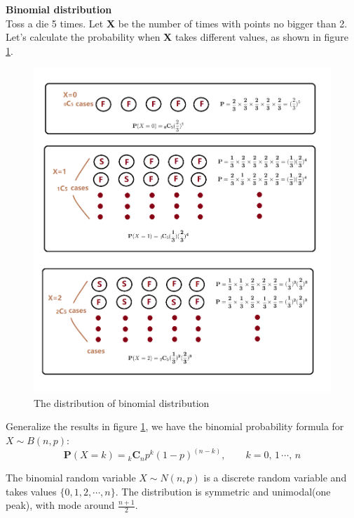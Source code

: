 \documentclass[a4paper, 12pt,twoside]{book}
\begin{document}
      \noindent\textbf{Binomial distribution}\vspace{0.6cm}\\
Toss a die 5 times. Let \textbf{X} be the number of times with points no bigger than 2. Let's calculate the probability when \textbf{X} takes different values, as shown in figure \ref{BinomialDistribution}.
   \begin{figure}[H]
       \centering
       \includegraphics[scale=0.6]{BinomialDistribution}
       \caption{The distribution of binomial distribution}
       \label{BinomialDistribution}
   \end{figure}
   
   Generalize the results in figure \ref{BinomialDistribution}, we have the binomial probability formula for $X \sim B(n, p)$:
       $$\textbf{P}(X=k) = {}_k\textbf{C}_n p^k(1-p)^{(n-k)}, \qquad k = 0,\,1\, \cdots, \, n$$
       \colorbox{babypink}{\parbox{\textwidth}{
        The binomial random variable $X \sim N(n, p)$ is a discrete random variable and takes values $\{0, 1, 2, \cdots, n\}$. The distribution is symmetric and unimodal(one peak), with mode around $\displaystyle{\frac{n+1}{2}}$.
       }}
       
       \newpage
        
\end{document}
